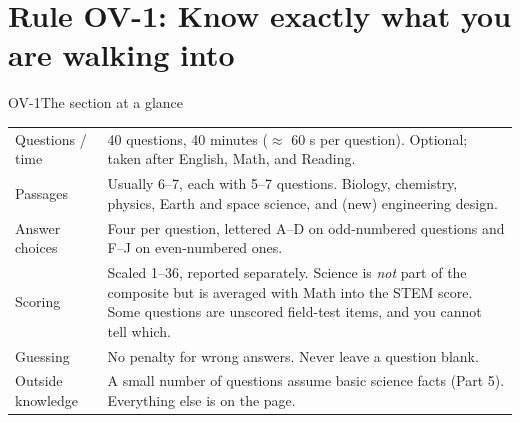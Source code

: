 \documentclass[11pt]{article}
\begin{document}
\maketitleblock

\begin{abstract}
On the enhanced ACT, Science is an optional fourth section: 40 multiple-choice questions in 40 minutes, built on six or seven passages of graphs, tables, experiment summaries, and one set of conflicting viewpoints. It is a reasoning test that happens to use science as its material. Most questions can be answered from the page, and the main threats are reading too slowly, misreading a figure, and losing time on one hard question. This part covers how the section is built and scored, a pacing plan with checkpoints, a passage-reading method, a map from question wording to the skill being tested, and the answer-choice traps ACT repeats. It ends with a classification drill, a pacing drill, and a short passage to try the method on. The other five parts are listed in Section~\ref{sec:plan}.
\end{abstract}

\scoringline

\tableofcontents
\clearpage

\section{Rule OV-1: Know exactly what you are walking into}

\begin{rulebox}{OV-1}{The section at a glance}
\renewcommand{\arraystretch}{1.15}
\begin{tabularx}{\linewidth}{@{}l X@{}}
Questions / time & 40 questions, 40 minutes ($\approx$ 60 s per question). Optional; taken after English, Math, and Reading.\\
Passages & Usually 6--7, each with 5--7 questions. Biology, chemistry, physics, Earth and space science, and (new) engineering design.\\
Answer choices & Four per question, lettered A--D on odd-numbered questions and F--J on even-numbered ones.\\
Scoring & Scaled 1--36, reported separately. Science is \emph{not} part of the composite but is averaged with Math into the STEM score. Some questions are unscored field-test items, and you cannot tell which.\\
Guessing & No penalty for wrong answers. Never leave a question blank.\\
Outside knowledge & A small number of questions assume basic science facts (Part 5). Everything else is on the page.\\
\end{tabularx}
\end{rulebox}
\end{document}
